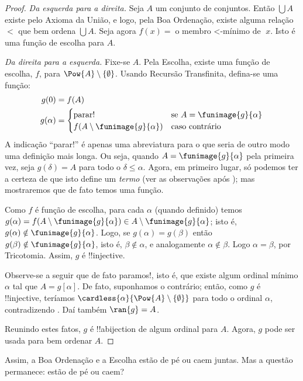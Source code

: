 \documentclass[../../../include/open-logic-section]{subfiles}
\begin{document}
\begin{proof}
\emph{Da esquerda para a direita.} Seja $A$ um conjunto de conjuntos. Então $\bigcup A$
existe pelo Axioma da União, e logo, pela Boa Ordenação, existe alguma relação
$<$ que bem ordena $\bigcup A$. Seja agora $f(x) = \text{o membro $<$-mínimo de }x$. Isto é uma função de escolha para $A$.

\emph{Da direita para a esquerda.} Fixe-se $A$. Pela Escolha, existe uma função de escolha,
$f$, para $\Pow{A} \setminus \{\emptyset\}$. Usando Recursão Transfinita, defina-se uma função:
\begin{align*}
	g(0) &= f(A)\\
	g(\alpha) &= 
		\begin{cases}
			\text{parar!{}} &\text{se }A = \funimage{g}{\alpha}\\
			f(A \setminus \funimage{g}{\alpha}) & \text{caso contrário}\\	
		\end{cases}
\end{align*}
A indicação ``parar!'' é apenas uma abreviatura para o que seria
de outro modo uma definição mais longa. Ou seja, quando $A =
\funimage{g}{\alpha}$ pela primeira vez, seja $g(\delta) = A$ para todo o
$\delta \leq \alpha$. Agora, em primeiro lugar, só podemos ter a certeza de que isto define um \emph{termo} (ver as observações após ); mas mostraremos que de fato temos uma função.

Como $f$ é função de escolha, para cada $\alpha$ (quando definido) temos $g(\alpha) =
f(A \setminus \funimage{g}{\alpha}) \in A \setminus
\funimage{g}{\alpha}$; isto é, $g(\alpha) \notin \funimage{g}{\alpha}$.
Logo, se $g(\alpha) = g(\beta)$ então $g(\beta) \notin
\funimage{g}{\alpha}$, isto é, $\beta \notin \alpha$, e analogamente
$\alpha \notin \beta$. Logo $\alpha = \beta$, por Tricotomia. Assim, $g$ é
!!{injective}.

Observe-se a seguir que de fato paramos!{}, isto é, que existe algum ordinal mínimo $\alpha$ tal que $A = g[\alpha]$. De fato, suponhamos o contrário; então, como $g$ é !!{injective}, teríamos $\cardless{\alpha}{\Pow{A} \setminus \{\emptyset\}}$ para
todo o ordinal $\alpha$, contradizendo . Daí também $\ran{g} = A$.

Reunindo estes fatos, $g$ é !!a{bijection} de algum ordinal para $A$. Agora, $g$ pode ser usada para bem ordenar $A$.
\end{proof}

Assim, a Boa Ordenação e a Escolha estão de pé ou caem juntas. Mas a questão
permanece: estão de pé ou caem?
\end{document}
